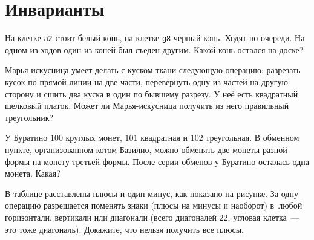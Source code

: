 

\section*{Инварианты}


\begin{problems}

\item
На клетке \texttt{a2} стоит белый конь, на клетке \texttt{g8} черный конь.
Ходят по очереди.
На одном из ходов один из коней был съеден другим.
Какой конь остался на доске?

\item
Марья-искусница умеет делать с куском ткани следующую операцию: разрезать кусок
по прямой линии на две части, перевернуть одну из частей на другую сторону и
сшить два куска в один по бывшему разрезу.
У неё есть квадратный шелковый платок.
Может ли Марья-искусница получить из него правильный треугольник?

\item
У Буратино $100$ круглых монет, $101$ квадратная и $102$ треугольная.
В обменном пункте, организованном котом Базилио, можно обменять две монеты
разной формы на монету третьей формы.
После серии обменов у Буратино осталась одна монета.
Какая?

\item
В таблице расставлены плюсы и один минус, как показано на рисунке.
За одну операцию разрешается поменять знаки (плюсы на минусы и наоборот)
в~любой горизонтали, вертикали или диагонали (всего диагоналей $22$, угловая
клетка~--- это тоже диагональ).
Докажите, что нельзя получить все плюсы.

\vspace{1ex}
\begin{center}
\end{center}
\vspace{1ex}



\end{problems}
